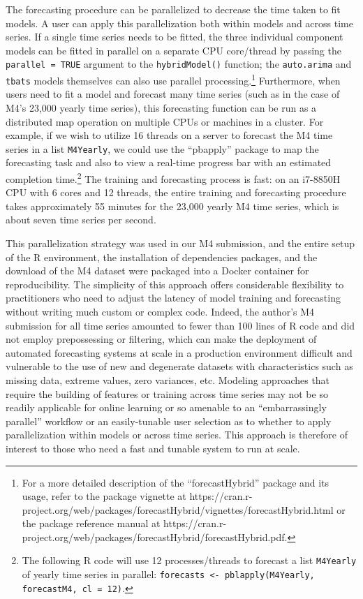 \documentclass[11pt,3p,review,authoryear]{elsarticle}
\begin{document}
The forecasting procedure can be parallelized to decrease the time taken to fit models. A user can apply this parallelization both within models and across time series. If a single time series needs to be fitted, the three individual component models can be fitted in parallel on a separate CPU core/thread by passing the \texttt{parallel = TRUE} argument to the \texttt{hybridModel()} function; the \texttt{auto.arima} and \texttt{tbats} models themselves can also use parallel processing.\footnote{For a more detailed description of the ``forecastHybrid'' package and its usage, refer to the package vignette at https://cran.r-project.org/web/packages/forecastHybrid/vignettes/forecastHybrid.html or the package reference manual at https://cran.r-project.org/web/packages/forecastHybrid/forecastHybrid.pdf.} Furthermore, when users need to fit a model and forecast many time series (such as in the case of M4's 23,000 yearly time series), this forecasting function can be run as a distributed map operation on multiple CPUs or machines in a cluster. For example, if we wish to utilize 16 threads on a server to forecast the M4 time series in a list \texttt{M4Yearly}, we could use the ``pbapply'' package \citep{pbapply} to map the forecasting task and also to view a real-time progress bar with an estimated completion time.\footnote{The following R code will use 12 processes/threads to forecast a list \texttt{M4Yearly} of yearly time series in parallel: \texttt{forecasts <- pblapply(M4Yearly, forecastM4, cl = 12)}.} The training and forecasting process is fast: on an i7-8850H CPU with 6 cores and 12 threads, the entire training and forecasting procedure takes approximately 55 minutes for the 23,000 yearly M4 time series, which is about seven time series per second.


This parallelization strategy was used in our M4 submission, and the entire setup of the R environment, the installation of dependencies packages, and the download of the M4 dataset were packaged into a Docker container for reproducibility. The simplicity of this approach offers considerable flexibility to practitioners who need to adjust the latency of model training and forecasting without writing much custom or complex code. Indeed, the author's M4 submission for all time series amounted to fewer than 100 lines of R code and did not employ prepossessing or filtering, which can make the deployment of automated forecasting systems at scale in a production environment difficult and vulnerable to the use of new and degenerate datasets with characteristics such as missing data, extreme values, zero variances, etc. Modeling approaches that require the building of features or training across time series may not be so readily applicable for online learning or so amenable to an ``embarrassingly parallel'' workflow or an easily-tunable user selection as to whether to apply parallelization within models or across time series. This approach is therefore of interest to those who need a fast and tunable system to run at scale.
\end{document}
